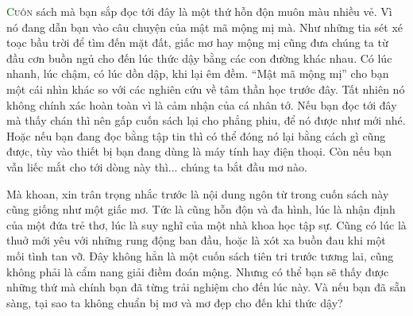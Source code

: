 \lettrine[lines=3]{\initfamily\textcolor{darkgreen}{C}}{uốn} sách mà bạn sắp đọc tới đây là một thứ hỗn độn muôn màu nhiều vẻ. 
Vì nó đang dẫn bạn vào câu chuyện của mật mã mộng mị mà. 
Như những tia sét xé toạc bầu trời để tìm đến mặt đất, giấc mơ hay mộng mị cũng đưa chúng ta từ đầu cơn buồn ngủ cho đến lúc thức dậy bằng các con đường khác nhau. 
Có lúc nhanh, lúc chậm, có lúc dồn dập, khi lại êm đềm. 
``Mật mã mộng mị'' cho bạn một cái nhìn khác so với các nghiên cứu về tâm thần học trước đây. 
Tất nhiên nó không chính xác hoàn toàn vì là cảm nhận của cá nhân tớ. 
Nếu bạn đọc tới đây mà thấy chán thì nên gấp cuốn sách lại cho phẳng phiu, để nó được như mới nhé. 
Hoặc nếu bạn đang đọc bằng tập tin thì có thể đóng nó lại bằng cách gì cũng được, tùy vào thiết bị bạn đang dùng là máy tính hay điện thoại. 
Còn nếu bạn vẫn liếc mắt cho tới dòng này thì... chúng ta bắt đầu mơ nào. 

Mà khoan, xin trân trọng nhắc trước là nội dung ngôn từ trong cuốn sách này cũng giống như một giấc mơ. 
Tức là cũng hỗn độn và đa hình, lúc là nhận định của một đứa trẻ thơ, lúc là suy nghĩ của một nhà khoa học tập sự. 
Cũng có lúc là thuở mới yêu với những rung động ban đầu, hoặc là xót xa buồn đau khi một mối tình tan vỡ. 
Đây không hẳn là một cuốn sách tiên tri trước tương lai, cũng không phải là cẩm nang giải điềm đoán mộng. 
Nhưng có thể bạn sẽ thấy được những thứ mà chính bạn đã từng trải nghiệm cho đến lúc này. 
Và nếu bạn đã sẵn sàng, tại sao ta không chuẩn bị mơ và mơ đẹp cho đến khi thức dậy? 


